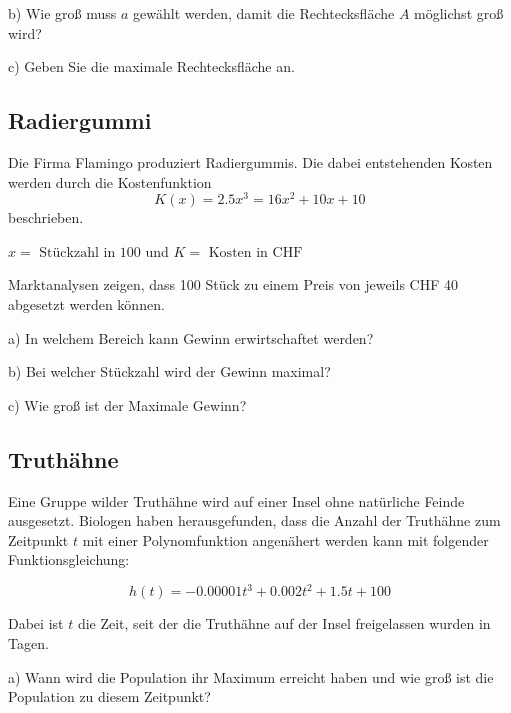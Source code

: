 b) Wie groß muss $a$ gewählt werden, damit die Rechtecksfläche $A$
möglichst groß wird?

c) Geben Sie die maximale Rechtecksfläche an.

\subsection{Radiergummi}
Die Firma Flamingo produziert Radiergummis. Die dabei entstehenden
Kosten werden durch die Kostenfunktion
$$K(x) = 2.5x^3 = 16x^2 + 10x + 10$$
beschrieben.

$x = \text{ Stückzahl in 100}$ und $K = \text{ Kosten in CHF}$

Marktanalysen zeigen, dass 100 Stück zu einem Preis von jeweils CHF 40
abgesetzt werden können.

a) In welchem Bereich kann Gewinn erwirtschaftet werden?

b) Bei welcher Stückzahl wird der Gewinn maximal?

c) Wie groß ist der Maximale Gewinn?



\subsection{Truthähne}
Eine Gruppe wilder Truthähne wird auf einer Insel ohne natürliche Feinde ausgesetzt. Biologen haben
herausgefunden, dass die Anzahl der Truthähne zum Zeitpunkt $t$ mit
einer Polynomfunktion angenähert werden kann mit folgender
Funktionsgleichung:

$$h(t) = -0.00001 t^3 + 0.002 t^2 + 1.5t + 100$$

Dabei ist $t$ die Zeit, seit der die Truthähne auf der Insel freigelassen wurden in Tagen.

a)
Wann wird die Population ihr Maximum erreicht haben und wie groß ist die Population zu
diesem Zeitpunkt?

